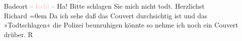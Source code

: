                   Bade{\pb}ort – \textcolor{pink}{Ischl}{}\ledrightnote{\textcolor{pink}{Bad Ischl}} – Ha! Bitte schlagen Sie mich nicht todt.\pend
           \pstart
           Herzlichst{\\[\baselineskip]}\spacefill\mbox{Richard}\pend
           \leftskip=0em{}\pstart
           \noindent{}{\pb}Da ich sehe daß das Couvert
                  durchsichtig ist und das »Todtschlagen« die Polizei beunruhigen könnte so nehme
                  ich noch ein Couvert drüber.\pend
           \pstart
           \raggedleft{}R\pend
           \endnumbering{}  
      